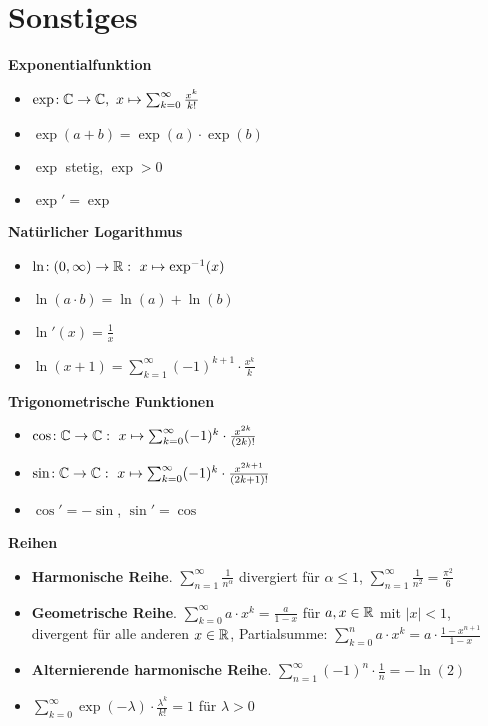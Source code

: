 \section{Sonstiges}

\textbf{Exponentialfunktion}
\begin{itemize}
\item $\exp\!: \mathbb{C}\to\mathbb{C},\ x \mapsto \sum_{k=0}^\infty \frac{x^k}{k!}$

\item $\exp(a + b) = \exp(a) \cdot \exp(b)$

\item $\exp$ stetig, $\exp > 0$

\item $\exp' = \exp$
\end{itemize}

\textbf{Natürlicher Logarithmus}
\begin{itemize}
\item $\ln\!: (0,\infty)\to\mathbb{R}:\ x \mapsto \exp^{-1}(x)$

\item $\ln(a \cdot b) = \ln(a) + \ln(b)$

\item $\ln'(x) = \frac{1}{x}$

\item $\ln(x+1) = \sum_{k=1}^{\infty }(-1)^{k+1}\cdot {\frac {x^{k}}{k}}$
\end{itemize}

\textbf{Trigonometrische Funktionen}
\begin{itemize}
\item $\cos\!: \mathbb{C}\to\mathbb{C}:\ x \mapsto \sum_{k=0}^\infty (-1)^k \cdot \frac{x^{2k}}{(2k)!}$

\item $\sin\!: \mathbb{C}\to\mathbb{C}:\ x \mapsto \sum_{k=0}^\infty (-1)^k \cdot \frac{x^{2k+1}}{(2k+1)!}$

\item $\cos' = -\sin$, $\sin' = \cos$
\end{itemize}

\textbf{Reihen}
\begin{itemize}
\item \textbf{Harmonische Reihe}. $\sum_{n=1}^\infty \frac{1}{n^\alpha}$ divergiert für $\alpha\leq 1$, $\sum_{n=1}^\infty \frac{1}{n^2}=\frac{\pi^2}{6}$

\item \textbf{Geometrische Reihe}.
  $\sum_{k=0}^\infty a \cdot x^k = \frac{a}{1-x}$
  für $a,x\in\mathbb{R}$ mit $|x| < 1$, divergent für alle anderen $x\in\mathbb{R}$, Partialsumme: $\sum_{k=0}^n a \cdot x^k=a\cdot\frac{1-x^{n+1}}{1-x}$

\item \textbf{Alternierende harmonische Reihe}.
$\sum_{n=1}^\infty (-1)^n \cdot \frac{1}{n} = -\ln(2)$

\item $\sum_{k=0}^\infty \exp(-\lambda) \cdot \frac{\lambda^k}{k!} = 1$
  für $\lambda > 0$
\end{itemize}

